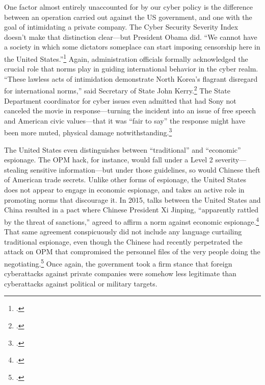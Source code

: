 \documentclass{memoir}
\begin{document}
\begin{refsegment}
One factor almost entirely unaccounted for by our cyber policy is the difference between an operation carried out against the US government, and one with the goal of intimidating a private company. The Cyber Security Severity Index doesn't make that distinction clear---but President Obama did. ``We cannot have a society in which some dictators someplace can start imposing censorship here in the United States.''\footcite{perez_obama_2014} Again, administration officials formally acknowledged the crucial role that norms play in guiding international behavior in the cyber realm. ``These lawless acts of intimidation demonstrate North Korea's flagrant disregard for international norms,'' said Secretary of State John Kerry.\footcite{perez_obama_2014} The State Department coordinator for cyber issues even admitted that had Sony not canceled the movie in response---turning the incident into an issue of free speech and American civic values---that it was ``fair to say'' the response might have been more muted, physical damage notwithstanding.\footcite{nakashima_why_2015}


The United States even distinguishes between ``traditional'' and ``economic'' espionage. The OPM hack, for instance, would fall under a Level 2 severity---stealing sensitive information---but under those guidelines, so would Chinese theft of American trade secrets. Unlike other forms of espionage, the United States does not appear to engage in economic espionage, and takes an active role in promoting norms that discourage it. In 2015, talks between the United States and China resulted in a pact where Chinese President Xi Jinping, ``apparently rattled by the threat of sanctions,'' agreed to affirm a norm against economic espionage.\footcite{nakashima_u.s._2015} That same agreement conspicuously did not include any language curtailing traditional espionage, even though the Chinese had recently perpetrated the attack on OPM that compromised the personnel files of the very people doing the negotiating.\footcite{nakashima_u.s._2015} Once again, the government took a firm stance that foreign cyberattacks against private companies were somehow less legitimate than cyberattacks against political or military targets.


\end{refsegment}
\end{document}
